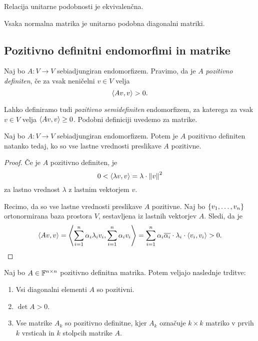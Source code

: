 \documentclass[12pt, a4paper]{article}
\begin{document}
\begin{opomba}
Relacija unitarne podobnosti je ekvivalenčna.
\end{opomba}

\begin{posledica}
Vsaka normalna matrika je unitarno podobna diagonalni matriki.
\end{posledica}

\newpage

\subsection{Pozitivno definitni endomorfimi in matrike}

\begin{okvir}
\begin{definicija}
Naj bo $A\colon V\to V$ sebiadjungiran endomorfizem. Pravimo, da je $A$ \emph{pozitivno definiten}, če za vsak neničelni $v\in V$ velja
\[
\left\langle Av,v\right\rangle>0.
\]
\end{definicija}
\end{okvir}

\begin{opomba}
Lahko definiramo tudi \emph{pozitivno semidefiniten} endomorfizem, za katerega za vsak $v\in V$ velja $\left\langle Av,v\right\rangle\geq 0$. Podobni definiciji uvedemo za matrike.
\end{opomba}

\begin{izrek}
Naj bo $A\colon V\to V$ sebiadjungiran endomorfizem. Potem je $A$ pozitivno definiten natanko tedaj, ko so vse lastne vrednosti preslikave $A$ pozitivne.
\end{izrek}

\begin{proof}
Če je $A$ pozitivno definiten, je
\[
0<\left\langle \lambda v,v\right\rangle=\lambda\cdot\left\lVert v\right\rVert^2
\]
za lastno vrednost $\lambda$ z lastnim vektorjem $v$.

Recimo, da so vse lastne vrednosti preslikave $A$ pozitivne. Naj bo $\left\{v_1,\dots,v_n\right\}$ ortonormirana baza prostora $V$, sestavljena iz lastnih vektorjev $A$. Sledi, da je
\[
\left\langle Av,v\right\rangle=\left\langle \sum_{i=1}^n\alpha_i\lambda_iv_i,\sum_{i=1}^n\alpha_iv_i\right\rangle=\sum_{i=1}^n\alpha_i\overline{\alpha_i}\cdot\lambda_i\cdot\left\langle v_i,v_i\right\rangle>0.\qedhere
\]
\end{proof}

\begin{trditev}
Naj bo $A\in\mathbb{F}^{n\times n}$ pozitivno definitna matrika. Potem veljajo naslednje trditve:

\begin{enumerate}
\item Vsi diagonalni elementi $A$ so pozitivni.
\item $\det A>0$.
\item Vse matrike $A_k$ so pozitivno definitne, kjer $A_k$ označuje $k\times k$ matriko v prvih $k$ vrsticah in $k$ stolpcih matrike $A$.
\end{enumerate}
\end{trditev}
\end{document}
